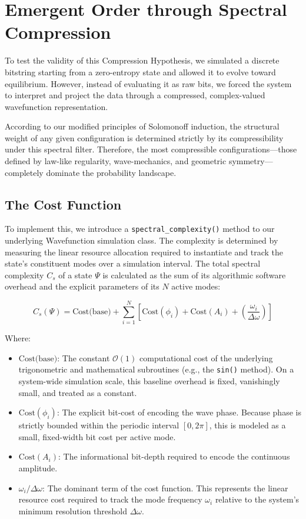 \section{Emergent Order through Spectral Compression}

To test the validity of this Compression Hypothesis, we simulated a discrete bitstring starting from a zero-entropy state and allowed it to evolve toward equilibrium.
However, instead of evaluating it as raw bits, we forced the system to interpret and project the data through a compressed, complex-valued wavefunction representation.

According to our modified principles of Solomonoff induction, the structural weight of any given configuration is determined strictly by its compressibility under this spectral filter.
Therefore, the most compressible configurations—those defined by law-like regularity, wave-mechanics, and geometric symmetry—completely dominate the probability landscape.

\subsection*{The Cost Function}

To implement this, we introduce a \texttt{spectral\_complexity()} method to our underlying Wavefunction simulation class. The complexity is determined by measuring the linear resource allocation required to instantiate and track the state's constituent modes over a simulation interval. The total spectral complexity $C_s$ of a state $\Psi$ is calculated as the sum of its algorithmic software overhead and the explicit parameters of its $N$ active modes:

\[
C_s(\Psi) = \text{Cost(base)} + \sum_{i=1}^{N} \left[ \text{Cost}(\phi_i) + \text{Cost}(A_i) + \left(\frac{\omega_i}{\Delta\omega}\right) \right]
\]

Where:
\begin{itemize}
    \item \textbf{$\text{Cost(base)}$}: The constant $\mathcal{O}(1)$ computational cost of the underlying trigonometric and mathematical subroutines (e.g., the \texttt{sin()} method). On a system-wide simulation scale, this baseline overhead is fixed, vanishingly small, and treated as a constant.
    \item \textbf{$\text{Cost}(\phi_i)$}: The explicit bit-cost of encoding the wave phase. Because phase is strictly bounded within the periodic interval $[0, 2\pi]$, this is modeled as a small, fixed-width bit cost per active mode.
    \item \textbf{$\text{Cost}(A_i)$}: The informational bit-depth required to encode the continuous amplitude.
    \item \textbf{$\omega_i / \Delta\omega$}: The dominant term of the cost function. This represents the linear resource cost required to track the mode frequency $\omega_i$ relative to the system's minimum resolution threshold $\Delta\omega$.
\end{itemize}

